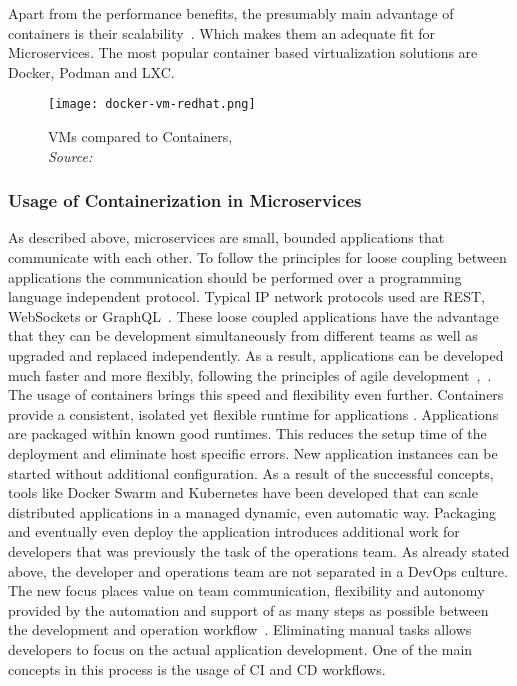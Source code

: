 \documentclass[12pt, a4paper]{article}
\begin{document}
        Apart from the performance benefits, the presumably main advantage of containers is their scalability~\cite{cintainer_scale}. Which makes them an adequate fit for Microservices. The most popular container based virtualization solutions are Docker, Podman and LXC.

        \begin{figure}
            \centering
            \texttt{[image: docker-vm-redhat.png]}
            \caption{\ac{VM}s compared to Containers, \\\textit{Source:~\cite{redhat_pic}}}\label{fig::vm_docker}
        \end{figure}

        \subsubsection{Usage of Containerization in Microservices}
        As described above, microservices are small, bounded applications that communicate with each other. To follow the principles for loose coupling between applications the communication should be performed over a programming language independent protocol. Typical \acs{IP} network protocols used are \ac{REST}, WebSockets or GraphQL~\cite{micro}. These loose coupled applications have the advantage that they can be development simultaneously from different teams as well as upgraded and replaced independently. As a result, applications can be developed much faster and more flexibly, following the principles of agile development~\cite{micro},~\cite{redhat_micro}.\newline
        The usage of containers brings this speed and flexibility even further. Containers provide a consistent, isolated yet flexible runtime for applications \cite{micro_container}. Applications are packaged within known good runtimes. This reduces the setup time of the deployment and eliminate host specific errors. New application instances can be started without additional configuration. As a result of the successful concepts, tools like Docker Swarm and Kubernetes have been developed that can scale distributed applications in a managed dynamic, even automatic way.\newline
        \noindent Packaging and eventually even deploy the application introduces additional work for developers that was previously the task of the operations team. As already stated above, the developer and operations team are not separated in a DevOps culture. The new focus places value on team communication, flexibility and autonomy provided by the automation and support of as many steps as possible between the development and operation workflow~\cite{effective_devops}. Eliminating manual tasks allows developers to focus on the actual application development. One of the main concepts in this process is the usage of \ac{CI} and \ac{CD} workflows.
\end{document}
